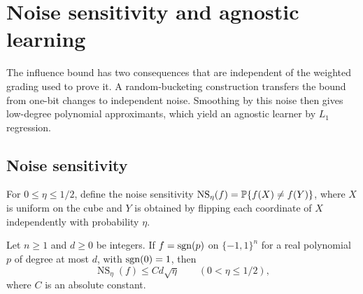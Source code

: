 \section{Noise sensitivity and agnostic learning}\label{sec:consequences}

The influence bound has two consequences that are independent of the
weighted grading used to prove it. A random-bucketing construction
transfers the bound from one-bit changes to independent noise.
Smoothing by this noise then gives low-degree polynomial approximants,
which yield an agnostic learner by $L_1$ regression.

\subsection{Noise sensitivity}

For $0\le\eta\le1/2$, define the noise sensitivity
$\operatorname{NS}_{\eta}(f)=\mathbb P\{f(X)\ne f(Y)\}$, where $X$ is uniform
on the cube and $Y$ is obtained by flipping each coordinate of $X$
independently with probability $\eta$.

\begin{corollary}\label{cor:noise-sensitivity}
Let $n\ge1$ and $d\ge0$ be integers. If $f=\operatorname{sgn}(p)$ on
$\{-1,1\}^n$ for a real polynomial $p$ of degree at most $d$, with
$\operatorname{sgn}(0)=1$, then
\[
 \operatorname{NS}_{\eta}(f)\le C d\sqrt\eta
 \qquad(0<\eta\le1/2),
\]
where $C$ is an absolute constant.
\end{corollary}

